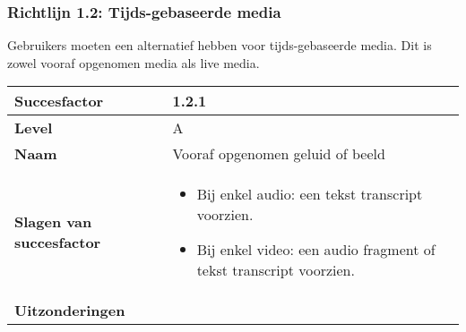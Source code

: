 \subsubsection{Richtlijn 1.2: Tijds-gebaseerde media}
Gebruikers moeten een alternatief hebben voor tijds-gebaseerde media. Dit is zowel vooraf opgenomen media als live media. 
\newpage
\begin{table}[H]
    \centering
    \hspace*{-1cm}\begin{tabular}{|l|p{12cm}|} 
        \hline
        \textbf{Succesfactor}                & 1.2.1                                                                                                                                                                                                                                                                                                             \\ 
        \hline
        \textbf{Level}                       & A                                                                                                                                                                                                                                                                                                                                                                             \\ 
        \hline
        \textbf{Naam}                        & Vooraf opgenomen geluid of beeld~                                                                                                                                                                                                                                                                                                                                                            \\ 
        \hline
        \textbf{Slagen van succesfactor}     & \begin{itemize}
            \item Bij enkel audio: een tekst transcript voorzien.
            \item Bij enkel video: een audio fragment of tekst transcript voorzien.
        \end{itemize}                                                                                                                                                                                                      \\ 
     \hline
    \textbf{Uitzonderingen}     & \begin{itemize}

\end{itemize}
\end{tabular}
\end{table}
